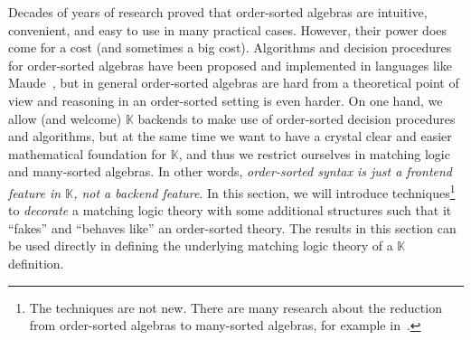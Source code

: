 \documentclass[UTF8,11pt]{article}
\theoremstyle{plain}
\theoremstyle{definition}
\theoremstyle{remark}
\newcommand{\K}{\mbox{$\mathbb{K}$}\xspace}
\begin{document}
Decades of years of research proved that order-sorted 
algebras are intuitive, convenient, and easy to use in many practical cases.
However, their power does come for a cost (and sometimes a big cost).
Algorithms and decision procedures for order-sorted algebras have been proposed 
and implemented in languages like Maude~\cite{clavel-et-al99a}, but in general 
order-sorted algebras 
are hard from a theoretical point of view and reasoning in an order-sorted 
setting is even harder.
On one hand, we allow (and welcome) \K backends to make use of order-sorted 
decision procedures and algorithms, but at the same time we want to have a 
crystal clear and easier mathematical foundation for \K, and thus we restrict 
ourselves in matching logic and many-sorted algebras.
In other words, \emph{order-sorted syntax is just a frontend feature in \K, not 
a backend feature}.
In this section, we will introduce techniques\footnote{The techniques are not 
new.  There are many research about the reduction from order-sorted 
algebras to many-sorted algebras, for example in~\cite{GOGUEN1992217}.} to 
\emph{decorate} a matching logic 
theory 
with some additional structures such that it ``fakes'' and ``behaves like'' an 
order-sorted theory.
The results in this section can be used directly in defining the underlying 
matching logic theory of a \K definition.

\end{document}
